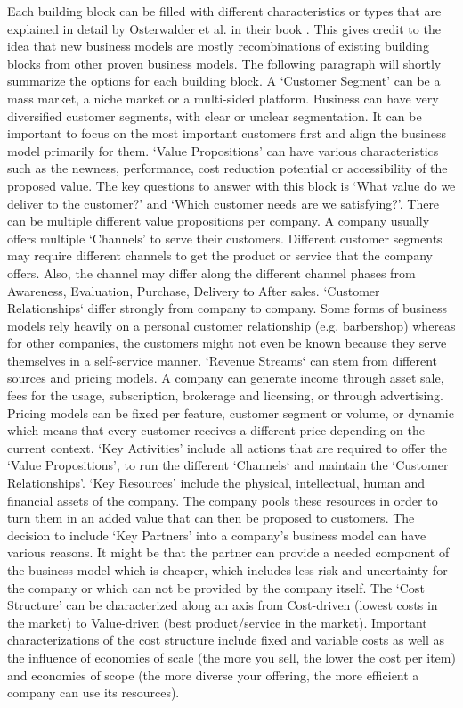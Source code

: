 		Each building block can be filled with different characteristics or types that are explained in detail by Osterwalder et al. in their book \cite{osterwalder}. This gives credit to the idea that new business models are mostly  recombinations of existing building blocks from other proven business models. The following paragraph will shortly summarize the options for each building block. A `Customer Segment' can be a mass market, a niche market or a multi-sided platform. Business can have very diversified customer segments, with clear or unclear segmentation. It can be important to focus on the most important customers first and align the business model primarily for them. `Value Propositions' can have various characteristics such as the newness, performance, cost reduction potential or accessibility of the proposed value. The key questions to answer with this block is `What value do we deliver to the customer?' and `Which customer needs are we satisfying?'. There can be multiple different value propositions per company. A company usually offers multiple `Channels' to serve their customers. Different customer segments may require different channels to get the product or service that the company offers. Also, the channel may differ along the different channel phases from Awareness, Evaluation, Purchase, Delivery to After sales. `Customer Relationships` differ strongly from company to company. Some forms of business models rely heavily on a personal customer relationship (e.g. barbershop) whereas for other companies, the customers might not even be known because they serve themselves in a self-service manner. `Revenue Streams` can stem from different sources and pricing models. A company can generate income through asset sale, fees for the usage, subscription, brokerage and licensing, or through advertising. Pricing models can be fixed per feature, customer segment or volume, or dynamic which means that every customer receives a different price depending on the current context. `Key Activities' include all actions that are required to offer the `Value Propositions', to run the different `Channels` and maintain the `Customer Relationships'. `Key Resources' include the physical, intellectual, human and financial assets of the company. The company pools these resources in order to turn them in an added value that can then be proposed to customers. The decision to include `Key Partners' into a company's business model can have various reasons. It might be that the partner can provide a needed component of the business model which is cheaper, which includes less risk and uncertainty for the company or which can not be provided by the company itself. The `Cost Structure' can be characterized along an axis from Cost-driven (lowest costs in the market) to Value-driven (best product/service in the market). Important characterizations of the cost structure include fixed and variable costs as well as the influence of economies of scale (the more you sell, the lower the cost per item) and economies of scope (the more diverse your offering, the more efficient a company can use its resources).\\
